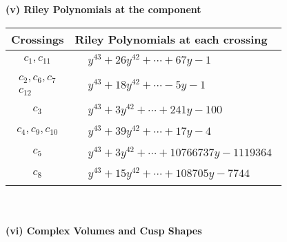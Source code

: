 \documentclass[1p]{elsarticle_modified}
\theoremstyle{definition}
\begin{document}
\newpage\renewcommand{\arraystretch}{1}
\flushleft \textbf{(v) Riley Polynomials at the component}\newline \\
\begin{tabular}{m{50pt}|m{274pt}}
Crossings & \hspace{64pt}Riley Polynomials at each crossing \\
\hline $$\begin{aligned}c_{1},c_{11}\end{aligned}$$&$\begin{aligned}
&y^{43}+26 y^{42}+\cdots+67 y-1
\end{aligned}$\\
\hline $$\begin{aligned}c_{2},c_{6},c_{7}\\c_{12}\end{aligned}$$&$\begin{aligned}
&y^{43}+18 y^{42}+\cdots-5 y-1
\end{aligned}$\\
\hline $$\begin{aligned}c_{3}\end{aligned}$$&$\begin{aligned}
&y^{43}+3 y^{42}+\cdots+241 y-100
\end{aligned}$\\
\hline $$\begin{aligned}c_{4},c_{9},c_{10}\end{aligned}$$&$\begin{aligned}
&y^{43}+39 y^{42}+\cdots+17 y-4
\end{aligned}$\\
\hline $$\begin{aligned}c_{5}\end{aligned}$$&$\begin{aligned}
&y^{43}+3 y^{42}+\cdots+10766737 y-1119364
\end{aligned}$\\
\hline $$\begin{aligned}c_{8}\end{aligned}$$&$\begin{aligned}
&y^{43}+15 y^{42}+\cdots+108705 y-7744
\end{aligned}$\\
\hline
\end{tabular}\\~\\
\newpage\flushleft \textbf{(vi) Complex Volumes and Cusp Shapes}
\end{document}
